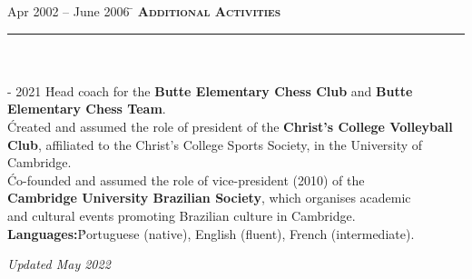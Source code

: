 \documentclass[11pt,a4paper]{article}
\begin{document}
\begin{tabbing}
Apr 2002 -- June 2006 \=\kill
\> \textbf{\large{\textsc{Additional Activities}}} \\
\> \noindent\rule{11cm}{1pt}\\
\\
 - 2021 \' Head coach for the \textbf{Butte Elementary Chess Club} and \textbf{Butte Elementary Chess Team}. \\[2mm]
  \' Created and assumed the role of president of the \textbf{Christ's College Volleyball} \\ 
\> \textbf{Club}, affiliated to the Christ's College Sports Society, in the University of \\ \> Cambridge. \\ [2mm]
 \' Co-founded and assumed the role of vice-president (2010)
of the \\ \> \textbf{Cambridge University Brazilian Society}, which organises academic \\ 
\>and cultural events promoting Brazilian culture in Cambridge. \\ [5mm]
\> \textbf{Languages:}\' Portuguese (native), English (fluent), French (intermediate). \\  
\end{tabbing}
\vspace*{\fill}
\hspace{3.5cm} \textit{Updated May 2022}
\end{document}
